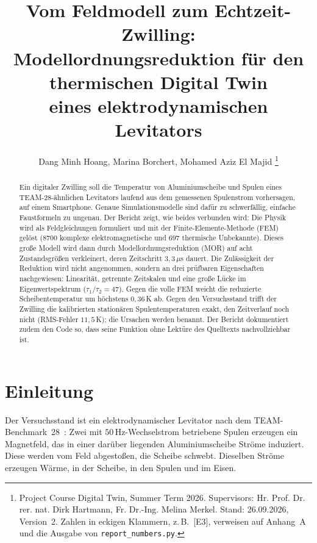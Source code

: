\documentclass[a4paper, 10pt, conference]{ieeeconf}
\title{\LARGE \bf
Vom Feldmodell zum Echtzeit-Zwilling:\\
Modellordnungsreduktion für den thermischen Digital Twin\\
eines elektrodynamischen Levitators
}
\author{Dang Minh Hoang, Marina Borchert, Mohamed Aziz El Majid
\thanks{Project Course Digital Twin, Summer Term 2026. Supervisors: Hr. Prof. Dr. rer. nat. Dirk Hartmann, Fr. Dr.-Ing. Melina Merkel. Stand: 26.09.2026, Version~2. Zahlen in eckigen Klammern, z.\,B.\ [E3], verweisen auf Anhang~A und die Ausgabe von \texttt{report\_numbers.py}.}%
}
\theoremstyle{remark}
\begin{document}
\maketitle
\thispagestyle{plain}
\pagestyle{plain}

\begin{abstract}
Ein digitaler Zwilling soll die Temperatur von Aluminiumscheibe und Spulen
eines TEAM-28-ähnlichen Levitators laufend aus dem gemessenen Spulenstrom
vorhersagen, auf einem Smartphone. Genaue Simulationsmodelle sind dafür zu
schwerfällig, einfache Faustformeln zu ungenau. Der Bericht zeigt, wie
beides verbunden wird: Die Physik wird als Feldgleichungen formuliert und
mit der Finite-Elemente-Methode (FEM) gelöst ($8700$ komplexe
elektromagnetische und $697$ thermische Unbekannte). Dieses große Modell
wird dann durch Modellordnungsreduktion (MOR) auf acht Zustandsgrößen
verkleinert, deren Zeitschritt $3{,}3\,\mu$s dauert. Die Zulässigkeit
der Reduktion wird nicht angenommen, sondern an drei prüfbaren
Eigenschaften nachgewiesen: Linearität, getrennte Zeitskalen und eine
große Lücke im Eigenwertspektrum ($\tau_1/\tau_2=47$). Gegen die volle FEM
weicht die reduzierte Scheibentemperatur um höchstens $0{,}36\,$K ab. Gegen
den Versuchsstand trifft der Zwilling die kalibrierten stationären
Spulentemperaturen exakt, den Zeitverlauf noch nicht (RMS-Fehler
$11{,}5\,$K); die Ursachen werden benannt. Der Bericht dokumentiert zudem
den Code so, dass seine Funktion ohne Lektüre des Quelltexts
nachvollziehbar ist.
\end{abstract}

\section{Einleitung}
\label{sec:intro}

Der Versuchsstand ist ein elektrodynamischer Levitator nach dem
TEAM-Benchmark~28~\cite{team28}: Zwei mit $50\,$Hz-Wechselstrom betriebene
Spulen erzeugen ein Magnetfeld, das in einer darüber liegenden
Aluminiumscheibe Ströme induziert. Diese werden vom Feld abgestoßen, die
Scheibe schwebt. Dieselben Ströme erzeugen Wärme, in der Scheibe, in den
Spulen und im Eisen.
\end{document}
